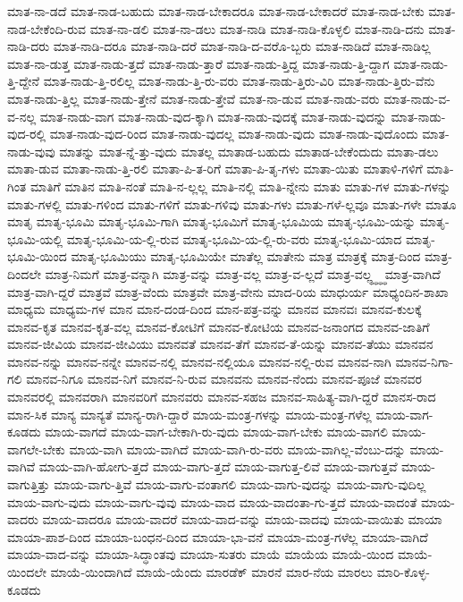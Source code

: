 {ಮಾತ-ನಾ-ಡದೆ
ಮಾತ-ನಾಡ-ಬಹುದು
ಮಾತ-ನಾಡ-ಬೇಕಾದರೂ
ಮಾತ-ನಾಡ-ಬೇಕಾದರೆ
ಮಾತ-ನಾಡ-ಬೇಕು
ಮಾತ-ನಾಡ-ಬೇಕೆಂದಿ-ರುವ
ಮಾತ-ನಾ-ಡಲಿ
ಮಾತ-ನಾ-ಡಲು
ಮಾತ-ನಾಡಿ
ಮಾತ-ನಾಡಿ-ಕೊಳ್ಳಲಿ
ಮಾತ-ನಾಡಿ-ದನು
ಮಾತ-ನಾಡಿ-ದರು
ಮಾತ-ನಾಡಿ-ದರೂ
ಮಾತ-ನಾಡಿ-ದರೆ
ಮಾತ-ನಾಡಿ-ದ-ವರೊ-ಬ್ಬರು
ಮಾತ-ನಾಡಿದೆ
ಮಾತ-ನಾಡಿಲ್ಲ
ಮಾತ-ನಾ-ಡುತ್ತ
ಮಾತ-ನಾಡು-ತ್ತದೆ
ಮಾತ-ನಾಡು-ತ್ತಾರೆ
ಮಾತ-ನಾಡು-ತ್ತಿದ್ದ
ಮಾತ-ನಾಡು-ತ್ತಿ-ದ್ದಾಗ
ಮಾತ-ನಾಡು-ತ್ತಿ-ದ್ದೇನೆ
ಮಾತ-ನಾಡು-ತ್ತಿ-ರಲಿಲ್ಲ
ಮಾತ-ನಾಡು-ತ್ತಿ-ರು-ವರು
ಮಾತ-ನಾಡು-ತ್ತಿರು-ವಿರಿ
ಮಾತ-ನಾಡು-ತ್ತಿರು-ವೆನು
ಮಾತ-ನಾಡು-ತ್ತಿಲ್ಲ
ಮಾತ-ನಾಡು-ತ್ತೇನೆ
ಮಾತ-ನಾಡು-ತ್ತೇವೆ
ಮಾತ-ನಾ-ಡುವ
ಮಾತ-ನಾಡು-ವರು
ಮಾತ-ನಾಡು-ವ-ವ-ನಲ್ಲ
ಮಾತ-ನಾಡು-ವಾಗ
ಮಾತ-ನಾಡು-ವುದ-ಕ್ಕಾಗಿ
ಮಾತ-ನಾಡು-ವುದಕ್ಕೆ
ಮಾತ-ನಾಡು-ವುದನ್ನು
ಮಾತ-ನಾಡು-ವುದ-ರಲ್ಲಿ
ಮಾತ-ನಾಡು-ವುದ-ರಿಂದ
ಮಾತ-ನಾಡು-ವುದಲ್ಲ
ಮಾತ-ನಾಡು-ವುದು
ಮಾತ-ನಾಡು-ವುದೊಂದು
ಮಾತ-ನಾಡು-ವುವು
ಮಾತನ್ನು
ಮಾತ-ನ್ನೆ-ತ್ತು-ವುದು
ಮಾತಲ್ಲ
ಮಾತಾಡ-ಬಹುದು
ಮಾತಾಡ-ಬೇಕೆಂದುದು
ಮಾತಾ-ಡಲು
ಮಾತಾ-ಡುವ
ಮಾತಾ-ನಾಡು-ತ್ತಿ-ರಲಿ
ಮಾತಾ-ಪಿ-ತ-ರಿಗೆ
ಮಾತಾ-ಪಿ-ತೃ-ಗಳು
ಮಾತಾ-ಯಿತು
ಮಾತಾಳಿ-ಗಳಿಗೆ
ಮಾತಿ-ಗಿಂತ
ಮಾತಿಗೆ
ಮಾತಿನ
ಮಾತಿ-ನಂತೆ
ಮಾತಿ-ನ-ಲ್ಲಲ್ಲ
ಮಾತಿ-ನಲ್ಲಿ
ಮಾತಿ-ನ್ನೇನು
ಮಾತು
ಮಾತು-ಗಳ
ಮಾತು-ಗಳನ್ನು
ಮಾತು-ಗಳಲ್ಲಿ
ಮಾತು-ಗಳಿಂದ
ಮಾತು-ಗಳಿಗೆ
ಮಾತು-ಗಳಿವು
ಮಾತು-ಗಳು
ಮಾತು-ಗಳೆ-ಲ್ಲವೂ
ಮಾತು-ಗಳೇ
ಮಾತೂ
ಮಾತೃ
ಮಾತೃ-ಭೂಮಿ
ಮಾತೃ-ಭೂಮಿ-ಗಾಗಿ
ಮಾತೃ-ಭೂಮಿಗೆ
ಮಾತೃ-ಭೂಮಿಯ
ಮಾತೃ-ಭೂಮಿ-ಯನ್ನು
ಮಾತೃ-ಭೂಮಿ-ಯಲ್ಲಿ
ಮಾತೃ-ಭೂಮಿ-ಯ-ಲ್ಲಿ-ರುವ
ಮಾತೃ-ಭೂಮಿ-ಯ-ಲ್ಲಿ-ರು-ವರು
ಮಾತೃ-ಭೂಮಿ-ಯಾದ
ಮಾತೃ-ಭೂಮಿ-ಯಿಂದ
ಮಾತೃ-ಭೂಮಿಯು
ಮಾತೃ-ಭೂಮಿಯೇ
ಮಾತೆಲ್ಲ
ಮಾತೇನು
ಮಾತ್ರ
ಮಾತ್ರಕ್ಕೆ
ಮಾತ್ರ-ದಿಂದ
ಮಾತ್ರ-ದಿಂದಲೇ
ಮಾತ್ರ-ನಿಮಗೆ
ಮಾತ್ರ-ವನ್ನಾಗಿ
ಮಾತ್ರ-ವನ್ನು
ಮಾತ್ರ-ವಲ್ಲ
ಮಾತ್ರ-ವ-ಲ್ಲದೆ
ಮಾತ್ರ-ವಲ್ಲ್ಧ್ಧ್ಧ್ಧ
ಮಾತ್ರ-ವಾಗಿದೆ
ಮಾತ್ರ-ವಾಗಿ-ದ್ದರೆ
ಮಾತ್ರವೆ
ಮಾತ್ರ-ವೆಂದು
ಮಾತ್ರವೇ
ಮಾತ್ರ-ವೇನು
ಮಾದ-ರಿಯ
ಮಾಧುರ್ಯ
ಮಾಧ್ಯಂದಿನ-ಶಾಖಾ
ಮಾಧ್ಯಮ
ಮಾಧ್ಯಮ-ಗಳ
ಮಾನ
ಮಾನ-ದಂಡ-ದಿಂದ
ಮಾನ-ಪತ್ರ-ವನ್ನು
ಮಾನವ
ಮಾನವಃ
ಮಾನವ-ಕುಲಕ್ಕೆ
ಮಾನವ-ಕೃತ
ಮಾನವ-ಕೃತ-ವಲ್ಲ
ಮಾನವ-ಕೋಟಿಗೆ
ಮಾನವ-ಕೋಟಿಯ
ಮಾನವ-ಜನಾಂಗದ
ಮಾನವ-ಜಾತಿಗೆ
ಮಾನವ-ಜೀವಿಯ
ಮಾನವ-ಜೀವಿಯು
ಮಾನವತೆ
ಮಾನವ-ತೆಗೆ
ಮಾನವ-ತೆ-ಯನ್ನು
ಮಾನವ-ತೆಯು
ಮಾನವನ
ಮಾನವ-ನನ್ನು
ಮಾನವ-ನನ್ನೇ
ಮಾನವ-ನಲ್ಲಿ
ಮಾನವ-ನಲ್ಲಿಯೂ
ಮಾನವ-ನಲ್ಲಿ-ರುವ
ಮಾನವ-ನಾಗಿ
ಮಾನವ-ನಿಗಾ-ಗಲಿ
ಮಾನವ-ನಿಗೂ
ಮಾನವ-ನಿಗೆ
ಮಾನವ-ನಿ-ರುವ
ಮಾನವನು
ಮಾನವ-ನೆಂದು
ಮಾನವ-ಪೂಜೆ
ಮಾನವರ
ಮಾನವರಲ್ಲಿ
ಮಾನವರಾಗಿ
ಮಾನವರಿಗೆ
ಮಾನವರು
ಮಾನವ-ಸಹಜ
ಮಾನವ-ಸಾಹಿತ್ಯ-ವಾಗಿ-ದ್ದರೆ
ಮಾನಸ-ರಾದ
ಮಾನ-ಸಿಕ
ಮಾನ್ಯ
ಮಾನ್ಯತೆ
ಮಾನ್ಯ-ರಾಗಿ-ದ್ದಾರೆ
ಮಾಯ-ಮಂತ್ರ-ಗಳನ್ನು
ಮಾಯ-ಮಂತ್ರ-ಗಳೆಲ್ಲ
ಮಾಯ-ವಾಗ-ಕೂಡದು
ಮಾಯ-ವಾಗದೆ
ಮಾಯ-ವಾಗ-ಬೇಕಾಗಿ-ರು-ವುದು
ಮಾಯ-ವಾಗ-ಬೇಕು
ಮಾಯ-ವಾಗಲಿ
ಮಾಯ-ವಾಗಲೇ-ಬೇಕು
ಮಾಯ-ವಾಗಿ
ಮಾಯ-ವಾಗಿದೆ
ಮಾಯ-ವಾಗಿ-ರು-ವರು
ಮಾಯ-ವಾಗಿಲ್ಲ-ವೆಂಬು-ದನ್ನು
ಮಾಯ-ವಾಗಿವೆ
ಮಾಯ-ವಾಗಿ-ಹೋಗು-ತ್ತದೆ
ಮಾಯ-ವಾಗು-ತ್ತದೆ
ಮಾಯ-ವಾಗುತ್ತ-ಲಿವೆ
ಮಾಯ-ವಾಗುತ್ತವೆ
ಮಾಯ-ವಾಗುತ್ತಿತ್ತು
ಮಾಯ-ವಾಗು-ತ್ತಿವೆ
ಮಾಯ-ವಾಗು-ವಂತಾಗಲಿ
ಮಾಯ-ವಾಗು-ವುದನ್ನು
ಮಾಯ-ವಾಗು-ವುದಿಲ್ಲ
ಮಾಯ-ವಾಗು-ವುದು
ಮಾಯ-ವಾಗು-ವುವು
ಮಾಯ-ವಾದ
ಮಾಯ-ವಾದಂತಾ-ಗು-ತ್ತದೆ
ಮಾಯ-ವಾದಂತೆ
ಮಾಯ-ವಾದರು
ಮಾಯ-ವಾದರೂ
ಮಾಯ-ವಾದರೆ
ಮಾಯ-ವಾದ-ವನ್ನು
ಮಾಯ-ವಾದವು
ಮಾಯ-ವಾಯಿತು
ಮಾಯಾ
ಮಾಯಾ-ಪಾಶ-ದಿಂದ
ಮಾಯಾ-ಬಂಧನ-ದಿಂದ
ಮಾಯಾ-ಭಾ-ವನೆ
ಮಾಯಾ-ಮಂತ್ರ-ಗಳೆಲ್ಲ
ಮಾಯಾ-ವಾಗಿದೆ
ಮಾಯಾ-ವಾದ-ವನ್ನು
ಮಾಯಾ-ಸಿದ್ಧಾಂತವು
ಮಾಯಾ-ಸುತರು
ಮಾಯೆ
ಮಾಯೆಯ
ಮಾಯೆ-ಯಿಂದ
ಮಾಯೆ-ಯಿಂದಲೇ
ಮಾಯೆ-ಯಿಂದಾಗಿದೆ
ಮಾಯೆ-ಯೆಂದು
ಮಾರಡೆಕ್
ಮಾರನೆ
ಮಾರ-ನೆಯ
ಮಾರಲು
ಮಾರಿ-ಕೊಳ್ಳ-ಕೂಡದು
}
